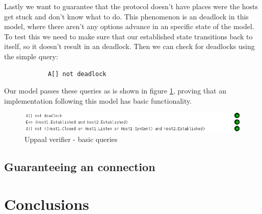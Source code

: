 \documentclass[twocolumn]{article}
\begin{document}
		Lastly we want to guarantee that the protocol doesn't have places were the hosts get stuck and don't know what to do. This phenomenon is an deadlock in this model, where there aren't any options advance in an specific state of the model. To test this we need to make sure that our established state transitions back to itself, so it doesn't result in an deadlock. Then we can check for deadlocks using the simple query:
		\begin{verbatim}
			A[] not deadlock
		\end{verbatim}

		Our model passes these queries as is shown in figure \ref{fig:verifier}, proving that an implementation following this model has basic functionality.
		\begin{figure}[h!]
			\begin{center}
				\includegraphics[width=\linewidth]{verifier.png}
			\end{center}
			\caption{Uppaal verifier - basic queries}
			\label{fig:verifier}
		\end{figure}
	\subsection{Guaranteeing an connection} %
	\label{sub:guaranteeing_an_connection}
	


\section{Conclusions}
\end{document}
